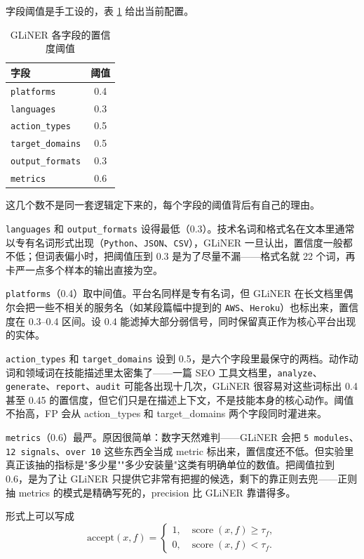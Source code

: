 字段阈值是手工设的，表 \ref{tab:thresholds} 给出当前配置。
\begin{table}[H]
\centering
\caption{GLiNER 各字段的置信度阈值}
\label{tab:thresholds}
\begin{tabular}{lc}
\toprule
字段 & 阈值 \\
\midrule
\texttt{platforms} & 0.4 \\
\texttt{languages} & 0.3 \\
\texttt{action\_types} & 0.5 \\
\texttt{target\_domains} & 0.5 \\
\texttt{output\_formats} & 0.3 \\
\texttt{metrics} & 0.6 \\
\bottomrule
\end{tabular}
\end{table}

这几个数不是同一套逻辑定下来的，每个字段的阈值背后有自己的理由。

\texttt{languages} 和 \texttt{output\_formats} 设得最低（0.3）。技术名词和格式名在文本里通常以专有名词形式出现（\texttt{Python}、\texttt{JSON}、\texttt{CSV}），GLiNER 一旦认出，置信度一般都不低；但词表偏小时，把阈值压到 0.3 是为了尽量不漏——格式名就 22 个词，再卡严一点多个样本的输出直接为空。

\texttt{platforms}（0.4）取中间值。平台名同样是专有名词，但 GLiNER 在长文档里偶尔会把一些不相关的服务名（如某段篇幅中提到的 \texttt{AWS}、\texttt{Heroku}）也标出来，置信度在 0.3--0.4 区间。设 0.4 能滤掉大部分弱信号，同时保留真正作为核心平台出现的实体。

\texttt{action\_types} 和 \texttt{target\_domains} 设到 0.5，是六个字段里最保守的两档。动作动词和领域词在技能描述里太密集了——一篇 SEO 工具文档里，\texttt{analyze}、\texttt{generate}、\texttt{report}、\texttt{audit} 可能各出现十几次，GLiNER 很容易对这些词标出 0.4 甚至 0.45 的置信度，但它们只是在描述上下文，不是技能本身的核心动作。阈值不抬高，FP 会从 action\_types 和 target\_domains 两个字段同时灌进来。

\texttt{metrics}（0.6）最严。原因很简单：数字天然难判——GLiNER 会把 \texttt{5 modules}、\texttt{12 signals}、\texttt{over 10} 这些东西全当成 metric 标出来，置信度还不低。但实验里真正该抽的指标是"多少星""多少安装量"这类有明确单位的数值。把阈值拉到 0.6，是为了让 GLiNER 只提供它非常有把握的候选，剩下的靠正则去兜——正则抽 metrics 的模式是精确写死的，precision 比 GLiNER 靠谱得多。

形式上可以写成
\begin{equation}
\label{eq:threshold}
\text{accept}(x,f)=
\begin{cases}
1, & \operatorname{score}(x,f)\ge \tau_f,\\
0, & \operatorname{score}(x,f)< \tau_f.
\end{cases}
\end{equation}

